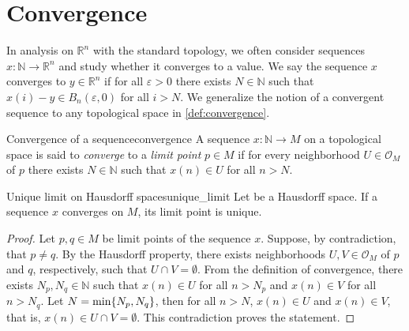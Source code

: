 \section{Convergence}

In analysis on \(\mathbb{R}^n\) with the standard topology, we often consider sequences \(x : \mathbb{N} \to \mathbb{R}^n\) and study whether it converges to a value. We say the sequence \(x\) converges to \(y \in \mathbb{R}^n\) if for all \(\varepsilon > 0\) there exists \(N \in \mathbb{N}\) such that \(x(i) - y \in B_n(\varepsilon, 0)\) for all \(i > N\). We generalize the notion of a convergent sequence to any topological space in \cref{def:convergence}.

\begin{definition}{Convergence of a sequence}{convergence}
    A sequence \(x : \mathbb{N} \to M\) on a topological space  is said to \emph{converge} to a \emph{limit point} \(p \in M\) if for every neighborhood \(U \in \mathcal{O}_M\) of \(p\) there exists \(N \in \mathbb{N}\) such that \(x(n) \in U\) for all \(n > N\).
\end{definition}

\begin{theorem}{Unique limit on Hausdorff spaces}{unique_limit}
    Let  be a Hausdorff space. If a sequence \(x\) converges on \(M\), its limit point is unique.
\end{theorem}
\begin{proof}
    Let \(p, q \in M\) be limit points of the sequence \(x\). Suppose, by contradiction, that \(p \neq q\). By the Hausdorff property, there exists neighborhoods \(U, V \in \mathcal{O}_M\) of \(p\) and \(q\), respectively, such that \(U \cap V = \emptyset\). From the definition of convergence, there exists \(N_p, N_q \in \mathbb{N}\) such that \(x(n) \in U\) for all \(n > N_p\) and \(x(n) \in V\) for all \(n > N_q\). Let \(N = \mathrm{min}\{N_p, N_q\}\), then for all \(n > N\), \(x(n) \in U\) and \(x(n) \in V\), that is, \(x(n) \in U \cap V = \emptyset\). This contradiction proves the statement.
\end{proof}
